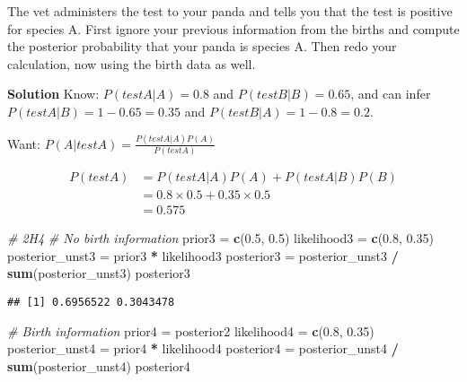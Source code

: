 \documentclass[
]{book}
\newenvironment{Shaded}{\begin{snugshade}}{\end{snugshade}}
\newcommand{\CommentTok}[1]{\textcolor[rgb]{0.56,0.35,0.01}{\textit{#1}}}
\newcommand{\FloatTok}[1]{\textcolor[rgb]{0.00,0.00,0.81}{#1}}
\newcommand{\KeywordTok}[1]{\textcolor[rgb]{0.13,0.29,0.53}{\textbf{#1}}}
\newcommand{\NormalTok}[1]{#1}
\newcommand{\OperatorTok}[1]{\textcolor[rgb]{0.81,0.36,0.00}{\textbf{#1}}}
\newcommand{\StringTok}[1]{\textcolor[rgb]{0.31,0.60,0.02}{#1}}
\begin{document}
The vet administers the test to your panda and tells you that the test is positive for species A. First ignore your previous information from the births and compute the posterior probability that your panda is species A. Then redo your calculation, now using the birth data as well.

\textbf{Solution}
Know: \(P(testA|A) = 0.8\) and \(P(testB|B)=0.65\), and can infer \(P(testA|B)=1-0.65 = 0.35\) and \(P(testB|A) = 1-0.8 = 0.2\).

Want: \(P(A|testA) = \frac{P(testA|A)P(A)}{P(testA)}\)

\[
\begin{aligned}
P(testA) &= P(testA|A)P(A) + P(testA|B)P(B) \\
&= 0.8\times0.5 + 0.35\times 0.5 \\
&= 0.575
\end{aligned}
\]

\begin{Shaded}
\begin{Highlighting}[]
\CommentTok{# 2H4}
\CommentTok{# No birth information}
\NormalTok{prior3 =}\StringTok{ }\KeywordTok{c}\NormalTok{(}\FloatTok{0.5}\NormalTok{, }\FloatTok{0.5}\NormalTok{)}
\NormalTok{likelihood3 =}\StringTok{ }\KeywordTok{c}\NormalTok{(}\FloatTok{0.8}\NormalTok{, }\FloatTok{0.35}\NormalTok{)}
\NormalTok{posterior_unst3 =}\StringTok{ }\NormalTok{prior3 }\OperatorTok{*}\StringTok{ }\NormalTok{likelihood3}
\NormalTok{posterior3 =}\StringTok{ }\NormalTok{posterior_unst3 }\OperatorTok{/}\StringTok{ }\KeywordTok{sum}\NormalTok{(posterior_unst3)}
\NormalTok{posterior3 }
\end{Highlighting}
\end{Shaded}

\begin{verbatim}
## [1] 0.6956522 0.3043478
\end{verbatim}

\begin{Shaded}
\begin{Highlighting}[]
\CommentTok{# Birth information}
\NormalTok{prior4 =}\StringTok{ }\NormalTok{posterior2}
\NormalTok{likelihood4 =}\StringTok{ }\KeywordTok{c}\NormalTok{(}\FloatTok{0.8}\NormalTok{, }\FloatTok{0.35}\NormalTok{)}
\NormalTok{posterior_unst4 =}\StringTok{ }\NormalTok{prior4 }\OperatorTok{*}\StringTok{ }\NormalTok{likelihood4}
\NormalTok{posterior4 =}\StringTok{ }\NormalTok{posterior_unst4 }\OperatorTok{/}\StringTok{ }\KeywordTok{sum}\NormalTok{(posterior_unst4)}
\NormalTok{posterior4 }
\end{Highlighting}
\end{Shaded}
\end{document}
